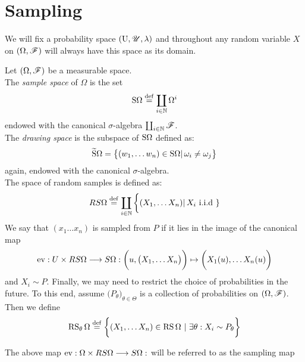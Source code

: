 \section{Sampling}



\begin{convention}\label{conv:prob_univ}
We will fix a probability space $(\textrm{U}, \r{U},\lambda)$ and throughout any random variable $X$ on $(\Omega,\r{F})$ will always have this space as its domain.
\end{convention}

\begin{definition}\label{prob:def:sampling}
Let $(\Omega, \r{F})$ be a measurable space.\\
The \emph{sample space} of $\Omega$ is the set 
\[
\textrm{S} \Omega\stackrel{\operatorname{def}}{=} \coprod_{i \in \mathbb{N}}\Omega^i
\]
endowed with the canonical $\sigma$-algebra $\coprod_{i \in \d{N}} \r{F}$.\\
The \emph{drawing space} is the subspace of $\textrm{S} \Omega$ defined as:
\[
\widetilde{\textrm{S}} \Omega = \big\{ (w_1,\ldots w_n) \in \textrm{S} \Omega \vert \, \omega_i\neq \omega_j \big\}
\]
again, endowed with the canonical $\sigma$-algebra.\\
The space of random samples is defined as:
\[
RS\Omega\stackrel{\operatorname{def}}{=}  \coprod_{i \in \mathbb{N}} \bigg\{(X_1,\ldots X_n)\vert \, X_i \textrm{ i.i.d }\}
\] 
We say that $(x_1\ldots x_n)$ is sampled from $P$ if it lies in the image of the canonical map
\[
\operatorname{ev}: U\times RS\Omega\longrightarrow S\Omega: \bigg(u, \big(X_1,\ldots X_n\big)\bigg)\mapsto \bigg(X_1(u),\ldots X_n(u)\bigg)
\]
and $X_i\sim P$.
Finally, we may need to restrict the choice of probabilities in the future. To this end, assume $\big(P_\theta\big)_{\theta \in \Theta}$ is a collection of probabilities on $(\Omega,\r{F})$. Then we define
\[
\operatorname{RS}_\theta \Omega \stackrel{\operatorname{def}}{=} \bigg\{( X_1,\ldots X_n) \in \operatorname{RS}\Omega\,\,\vert \,\, \exists \theta: X_i\sim P_\theta \bigg\}
\]
\end{definition}


\begin{remark}\label{rem:prob_sampling-map}
The above map $\operatorname{ev}: \Omega\times RS\Omega\longrightarrow S\Omega: $
will be referred to as the sampling map
\end{remark}

